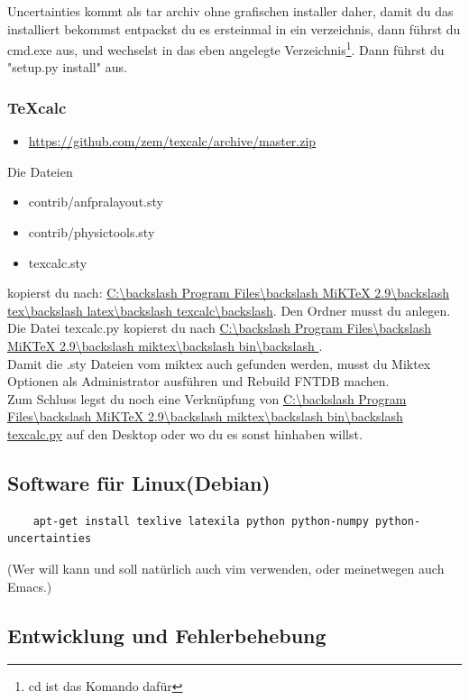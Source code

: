 \documentclass[a4paper]{article}
\newcommand{\texcalc}{{\TeX}calc}
\begin{document}
Uncertainties kommt als tar archiv ohne grafischen installer daher, damit du das installiert bekommst entpackst du es
ersteinmal in ein verzeichnis, dann führst du cmd.exe aus, und wechselst in das eben angelegte
Verzeichnis\footnote{cd ist das Komando dafür}. Dann führst du "setup.py install" aus.

\subsubsection{\texcalc}

\begin{itemize}
\item \url{https://github.com/zem/texcalc/archive/master.zip}
\end{itemize}

Die Dateien
\begin{itemize}
\item contrib/anfpralayout.sty
\item contrib/physictools.sty
\item texcalc.sty
\end{itemize}
kopierst du nach: \url{C:\backslash Program Files\backslash MiKTeX 2.9\backslash tex\backslash latex\backslash texcalc\backslash}. Den Ordner musst du anlegen.
Die Datei texcalc.py kopierst du nach \url{C:\backslash Program Files\backslash MiKTeX 2.9\backslash miktex\backslash bin\backslash }. \\

Damit die .sty Dateien vom miktex auch gefunden werden, musst du Miktex Optionen als Administrator
ausführen und Rebuild FNTDB machen.\\

Zum Schluss legst du noch eine Verknüpfung von \url{C:\backslash Program Files\backslash MiKTeX 2.9\backslash miktex\backslash bin\backslash texcalc.py}
auf den Desktop oder wo du es sonst hinhaben willst.


\subsection{Software für Linux(Debian)}

\begin{verbatim}
	apt-get install texlive latexila python python-numpy python-uncertainties
\end{verbatim}

(Wer will kann und soll natürlich auch vim verwenden, oder meinetwegen auch Emacs.)

\subsection{Entwicklung und Fehlerbehebung}
\end{document}

